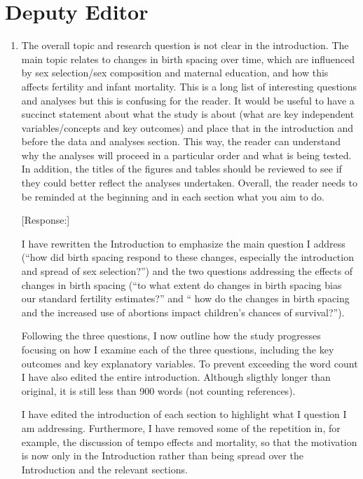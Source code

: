 \documentclass[letterpaper,12pt]{article}
\begin{document}
\section*{Deputy Editor}

\begin{enumerate}

\item The overall topic and research question is not clear in the
introduction. The main topic relates to changes in birth spacing over
time, which are influenced by sex selection/sex composition and maternal
education, and how this affects fertility and infant mortality. This is
a long list of interesting questions and analyses but this is confusing
for the reader. It would be useful to have a succinct statement about
what the study is about (what are key independent variables/concepts and
key outcomes) and place that in the introduction and before the data and
analyses section. This way, the reader can understand why the analyses
will proceed in a particular order and what is being tested. In
addition, the titles of the figures and tables should be reviewed to see
if they could better reflect the analyses undertaken. Overall, the
reader needs to be reminded at the beginning and in each section what
you aim to do.

[Response:] 

I have rewritten the Introduction to emphasize the main question I address
(``how did birth spacing respond to these changes, especially the introduction and spread 
of sex selection?'') and the two questions addressing the effects of changes in 
birth spacing (``to what extent do changes in birth spacing bias our standard fertility 
estimates?'' and `` how do the changes in birth spacing and the increased use of abortions 
impact children's chances of survival?'').

Following the three questions, I now outline how the study progresses focusing on 
how I examine each of the three questions, including the key outcomes and key explanatory 
variables.
To prevent exceeding the word count I have also edited the entire introduction.
Although sligthly longer than original, it is still less than 900 words 
(not counting references).

I have edited the introduction of each section to highlight what I question
I am addressing.
Furthermore, I have removed some of the repetition in, for example, the
discussion of tempo effects and mortality, so that the motivation is now only
in the Introduction rather than being spread over the Introduction and the
relevant sections.


\end{enumerate}
\end{document}
